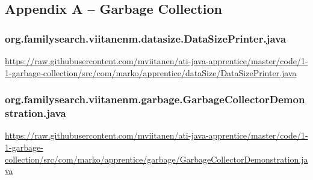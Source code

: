 \subsection*{Appendix A -- Garbage Collection} \label{App:AppendixA}

\subsubsection*{org.familysearch.viitanenm.datasize.DataSizePrinter.java}
\noindent\begin{minipage}{.6in}
\end{minipage}
\begin{minipage}{6in}
  \url{https://raw.githubusercontent.com/mviitanen/ati-java-apprentice/master/code/1-1-garbage-collection/src/com/marko/apprentice/dataSize/DataSizePrinter.java}
\end{minipage}

\vspace{1em}
\subsubsection*{org.familysearch.viitanenm.garbage.GarbageCollectorDemonstration.java}
\noindent\begin{minipage}{.6in}
    \end{minipage}
    \begin{minipage}{6in}    
      \url{https://raw.githubusercontent.com/mviitanen/ati-java-apprentice/master/code/1-1-garbage-collection/src/com/marko/apprentice/garbage/GarbageCollectorDemonstration.java}
    \end{minipage}


\vspace{1em}
